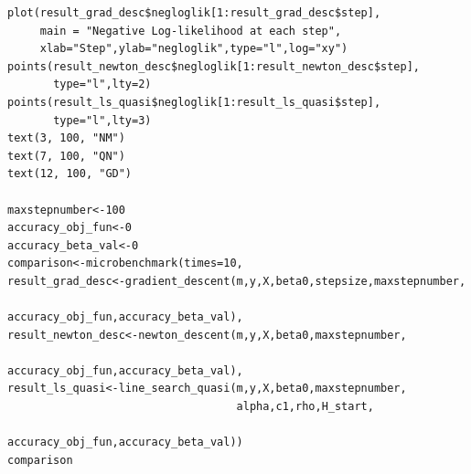 \documentclass{article}
\begin{document}
\begin{lstlisting}[basicstyle=\tiny]
plot(result_grad_desc$negloglik[1:result_grad_desc$step],
     main = "Negative Log-likelihood at each step",
     xlab="Step",ylab="negloglik",type="l",log="xy")
points(result_newton_desc$negloglik[1:result_newton_desc$step],
       type="l",lty=2)
points(result_ls_quasi$negloglik[1:result_ls_quasi$step],
       type="l",lty=3)
text(3, 100, "NM")
text(7, 100, "QN")
text(12, 100, "GD")

maxstepnumber<-100
accuracy_obj_fun<-0
accuracy_beta_val<-0
comparison<-microbenchmark(times=10,
result_grad_desc<-gradient_descent(m,y,X,beta0,stepsize,maxstepnumber,
                                   accuracy_obj_fun,accuracy_beta_val),
result_newton_desc<-newton_descent(m,y,X,beta0,maxstepnumber,
                                   accuracy_obj_fun,accuracy_beta_val),
result_ls_quasi<-line_search_quasi(m,y,X,beta0,maxstepnumber,
                                   alpha,c1,rho,H_start,
                                   accuracy_obj_fun,accuracy_beta_val))
comparison
\end{lstlisting}
\end{document}
